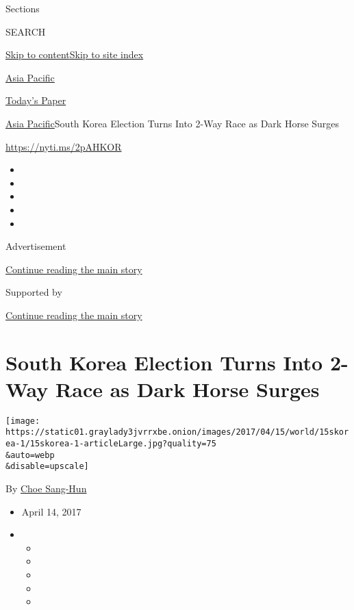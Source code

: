 Sections

SEARCH

\protect\hyperlink{site-content}{Skip to
content}\protect\hyperlink{site-index}{Skip to site index}

\href{https://www.nytimes3xbfgragh.onion/section/world/asia}{Asia
Pacific}

\href{https://myaccount.nytimes3xbfgragh.onion/auth/login?response_type=cookie\&client_id=vi}{}

\href{https://www.nytimes3xbfgragh.onion/section/todayspaper}{Today's
Paper}

\href{/section/world/asia}{Asia Pacific}\textbar{}South Korea Election
Turns Into 2-Way Race as Dark Horse Surges

\url{https://nyti.ms/2pAHKOR}

\begin{itemize}
\item
\item
\item
\item
\item
\end{itemize}

Advertisement

\protect\hyperlink{after-top}{Continue reading the main story}

Supported by

\protect\hyperlink{after-sponsor}{Continue reading the main story}

\hypertarget{south-korea-election-turns-into-2-way-race-as-dark-horse-surges}{%
\section{South Korea Election Turns Into 2-Way Race as Dark Horse
Surges}\label{south-korea-election-turns-into-2-way-race-as-dark-horse-surges}}

\texttt{[image: https://static01.graylady3jvrrxbe.onion/images/2017/04/15/world/15skorea-1/15skorea-1-articleLarge.jpg?quality=75\\\&auto=webp\\\&disable=upscale]}

By \href{https://www.nytimes3xbfgragh.onion/by/choe-sang-hun}{Choe
Sang-Hun}

\begin{itemize}
\item
  April 14, 2017
\item
  \begin{itemize}
  \item
  \item
  \item
  \item
  \item
  \end{itemize}
\end{itemize}

